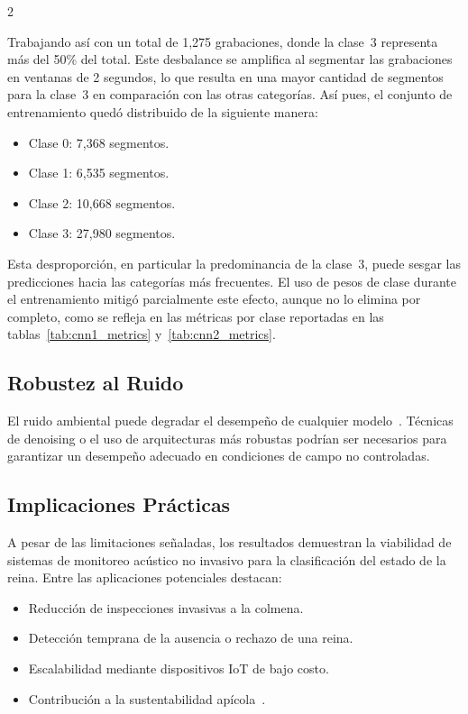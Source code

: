 \documentclass[12pt]{report}
\newenvironment{tightmulticols}{%
  \begin{multicols}{2}
  \setlength{\parskip}{1.2pt}
  \linespread{1}\selectfont
}{%
  \end{multicols}
}
\begin{document}
\begin{tightmulticols}
\noindent Trabajando así con un total de 1,275 grabaciones, donde la clase~3 representa más del 50\% del total. Este desbalance se amplifica al segmentar las grabaciones en ventanas de 2 segundos, lo que resulta en una mayor cantidad de segmentos para la clase~3 en comparación con las otras categorías. Así pues, el conjunto de entrenamiento quedó distribuido de la siguiente manera:

\begin{itemize}
    \item Clase 0: 7{,}368 segmentos.
    \item Clase 1: 6{,}535 segmentos.
    \item Clase 2: 10{,}668 segmentos.
    \item Clase 3: 27{,}980 segmentos.
\end{itemize}

\noindent Esta desproporción, en particular la predominancia de la clase~3, puede sesgar las predicciones hacia las categorías más frecuentes. El uso de pesos de clase durante el entrenamiento mitigó parcialmente este efecto, aunque no lo elimina por completo, como se refleja en las métricas por clase reportadas en las tablas~\ref{tab:cnn1_metrics} y~\ref{tab:cnn2_metrics}.

\subsection{Robustez al Ruido}

\noindent El ruido ambiental puede degradar el desempeño de cualquier modelo~\cite{peng2020}. Técnicas de denoising o el uso de arquitecturas más robustas podrían ser necesarios para garantizar un desempeño adecuado en condiciones de campo no controladas.

\subsection{Implicaciones Prácticas}

\noindent A pesar de las limitaciones señaladas, los resultados demuestran la viabilidad de sistemas de monitoreo acústico no invasivo para la clasificación del estado de la reina. Entre las aplicaciones potenciales destacan:

\begin{itemize}
    \item Reducción de inspecciones invasivas a la colmena.
    \item Detección temprana de la ausencia o rechazo de una reina.
    \item Escalabilidad mediante dispositivos IoT de bajo costo.
    \item Contribución a la sustentabilidad apícola~\cite{khalifa2021, potts2016}.
\end{itemize}


\end{tightmulticols}
\end{document}

